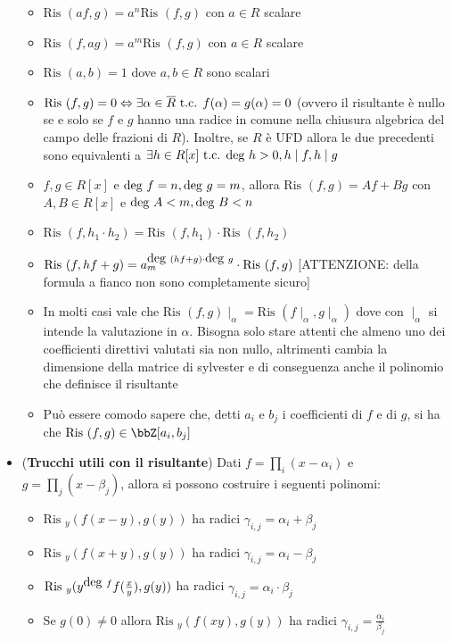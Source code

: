 \documentclass[a4paper,NoNotes,GeneralMath]{stdmdoc}
\newcommand{\Ris}{\text{Ris }}
\begin{document}
\begin{itemize}
\begin{itemize}
				\item $\Ris(af, g) = a^n \Ris(f, g)$ con $a \in R$ scalare
				\item $\Ris(f, ag) = a^m \Ris(f, g)$ con $a \in R$ scalare
				\item $\Ris(a, b) = 1$ dove $a, b \in R$ sono scalari
				\item $\Ris(f, g) = 0 \sse \exists \alpha \in \overline{R} \tc f(\alpha) = g(\alpha) = 0$ (ovvero il risultante è nullo se e solo se $f$ e $g$ hanno una radice in comune nella chiusura algebrica del campo delle frazioni di $R$). Inoltre, se $R$ è UFD allora le due precedenti sono equivalenti a $\exists h \in R[x] \mbox{ t.c. } \mbox{deg } h > 0, h \mid f, h \mid g$
				\item $f, g \in R[x]$ e $\mbox{deg } f = n, \mbox{deg } g = m$, allora $\Ris(f,g) = Af + Bg$ con $A, B \in R[x]$ e $\mbox{deg } A < m, \mbox{deg } B < n$
				\item $\Ris(f, h_1 \cdot h_2) = \Ris(f, h_1) \cdot \Ris(f, h_2)$
				\item $\Ris(f, hf+g) = a_m^{\Deg (hf + g) \cdot \Deg g} \cdot \Ris(f, g)$ [ATTENZIONE: della formula a fianco non sono completamente sicuro]
				\item In molti casi vale che $\Ris(f,g) \mid_\alpha = \Ris(f\mid_\alpha, g\mid_\alpha)$ dove con $\mid_\alpha$ si intende la valutazione in $\alpha$. Bisogna solo stare attenti che almeno uno dei coefficienti direttivi valutati sia non nullo, altrimenti cambia la dimensione della matrice di sylvester e di conseguenza anche il polinomio che definisce il risultante
				\item Può essere comodo sapere che, detti $a_i$ e $b_j$ i coefficienti di $f$ e di $g$, si ha che $\Ris(f, g) \in \bbZ[a_i, b_j]$
			\end{itemize}
		\item ({\bf Trucchi utili con il risultante}) Dati $f = \prod_i (x - \alpha_i)$ e $g = \prod_j (x - \beta_j)$, allora si possono costruire i seguenti polinomi:
			\begin{itemize}
				\item $\Ris_y (f(x-y), g(y))$ ha radici $\gamma_{i,j} = \alpha_i + \beta_j$
				\item $\Ris_y (f(x+y), g(y))$ ha radici $\gamma_{i,j} = \alpha_i - \beta_j$
				\item $\Ris_y (y^{\Deg f} f(\frac{x}{y}), g(y))$ ha radici $\gamma_{i,j} = \alpha_i \cdot \beta_j$
				\item Se $g(0) \neq 0$ allora $\Ris_y (f(xy), g(y))$ ha radici $\gamma_{i,j} = \frac{\alpha_i}{\beta_j}$
			\end{itemize}
	\end{itemize}
	
\end{document}

